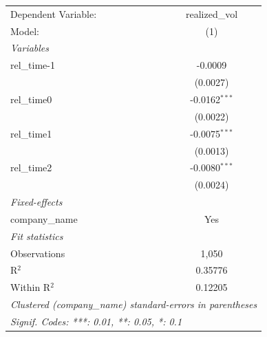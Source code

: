
\begingroup
\centering
\begin{tabular}{lc}
   \tabularnewline \midrule \midrule
   Dependent Variable: & realized\_vol\\   
   Model:              & (1)\\  
   \midrule
   \emph{Variables}\\
   rel\_time-1         & -0.0009\\   
                       & (0.0027)\\   
   rel\_time0          & -0.0162$^{***}$\\   
                       & (0.0022)\\   
   rel\_time1          & -0.0075$^{***}$\\   
                       & (0.0013)\\   
   rel\_time2          & -0.0080$^{***}$\\   
                       & (0.0024)\\   
   \midrule
   \emph{Fixed-effects}\\
   company\_name       & Yes\\  
   \midrule
   \emph{Fit statistics}\\
   Observations        & 1,050\\  
   R$^2$               & 0.35776\\  
   Within R$^2$        & 0.12205\\  
   \midrule \midrule
   \multicolumn{2}{l}{\emph{Clustered (company\_name) standard-errors in parentheses}}\\
   \multicolumn{2}{l}{\emph{Signif. Codes: ***: 0.01, **: 0.05, *: 0.1}}\\
\end{tabular}
\par\endgroup



